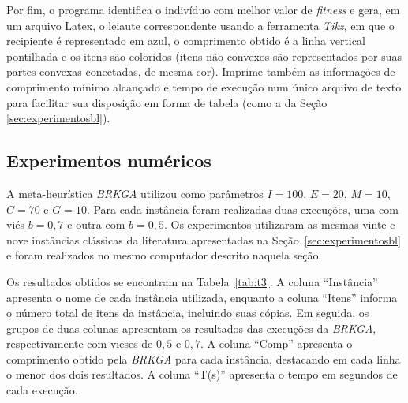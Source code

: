 \documentclass{article}
\begin{document}
Por fim, o programa identifica o indivíduo com melhor valor de {\it fitness} e gera, em um arquivo Latex, o leiaute correspondente usando a ferramenta {\it Tikz}, em que o recipiente é representado em azul, o comprimento obtido é a linha vertical pontilhada e os itens são coloridos (itens não convexos são representados por suas partes convexas conectadas, de mesma cor). Imprime também as informações de comprimento mínimo alcançado e tempo de execução num único arquivo de texto para facilitar sua disposição em forma de tabela (como a da Seção \ref{sec:experimentosbl}).


\subsection{Experimentos numéricos} \label{sec:experimentosBRKGA}

A meta-heurística {\it BRKGA} utilizou como parâmetros $I = 100$, $E = 20$, $M = 10$, $C = 70$ e $G = 10$. Para cada instância foram realizadas duas execuções, uma com viés $b = 0,7$ e outra com $b = 0,5$. Os experimentos utilizaram as mesmas vinte e nove instâncias clássicas da literatura apresentadas na Seção~\ref{sec:experimentosbl} e foram realizados no mesmo computador descrito naquela seção.

Os resultados obtidos se encontram na Tabela~\ref{tab:t3}. A coluna ``Instância'' apresenta o nome de cada instância utilizada, enquanto a coluna ``Itens'' informa o número total de itens da instância, incluindo suas cópias. Em seguida, os grupos de duas colunas apresentam os resultados das execuções da {\it BRKGA}, respectivamente com vieses de $0,5$ e $0,7$. A coluna ``Comp'' apresenta o comprimento obtido pela {\it BRKGA} para cada instância, destacando em cada linha o menor dos dois resultados. A coluna ``T(s)'' apresenta o tempo em segundos de cada execução.
\end{document}
